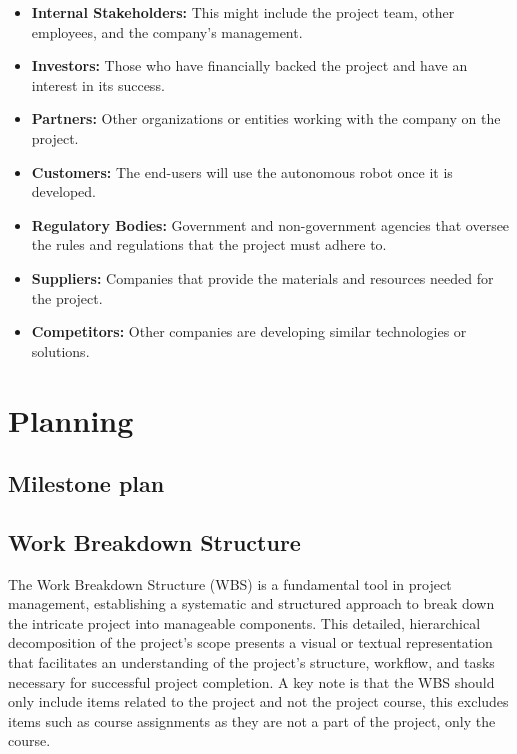 \documentclass[10pt]{projectdoc}
\begin{document}
\begin{itemize}
\item \textbf{Internal Stakeholders:} This might include the project team, other employees, and the company's management.
\item \textbf{Investors:} Those who have financially backed the project and have an interest in its success.
\item \textbf{Partners:} Other organizations or entities working with the company on the project.
\item \textbf{Customers:} The end-users will use the autonomous robot once it is developed.
\item \textbf{Regulatory Bodies:} Government and non-government agencies that oversee the rules and regulations that the project must adhere to.
\item \textbf{Suppliers:} Companies that provide the materials and resources needed for the project.
\item \textbf{Competitors:} Other companies are developing similar technologies or solutions.
\end{itemize}

\section{Planning}
\subsection{Milestone plan}

\subsection{Work Breakdown Structure}
The Work Breakdown Structure (WBS) is a fundamental tool in project management, establishing a systematic and structured approach to break down the intricate project into manageable components. This detailed, hierarchical decomposition of the project's scope presents a visual or textual representation that facilitates an understanding of the project's structure, workflow, and tasks necessary for successful project completion. A key note is that the WBS should only include items related to the project and not the project course, this excludes items such as course assignments as they are not a part of the project, only the course.
\end{document}
